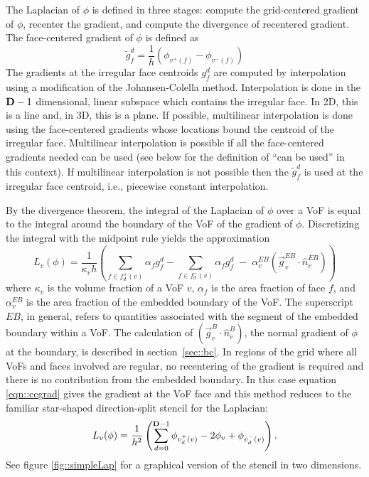 The Laplacian of $\phi$ is defined in three stages: compute the grid-centered
gradient of $\phi$, recenter the gradient, and compute the divergence of
recentered gradient.
The face-centered gradient of $\phi$ is defined as
\begin{equation}
\widetilde{g}^d_f = \frac{1}{h} \left( \phi_{v^+(f)} - \phi_{v^-(f)} \right)
\label{eqn::ccgrad}
\end{equation}
The gradients at the irregular face centroids $g_f^d$ are computed by
interpolation 
using a modification of the Johansen-Colella method.  Interpolation is done
in the ${\mathbf{D}} - 1$ dimensional, linear subspace which contains the irregular
face.  In 2D, this is a line and, in 3D, this is a plane.  If possible,
multilinear interpolation is done using the face-centered gradients whose
locations bound the centroid of the irregular face.  Multilinear interpolation
is possible if all the face-centered gradients needed can be used (see below
for the definition of ``can be used'' in this context).  If multilinear
interpolation is not possible then the $\widetilde{g}^d_f$ is used at the
irregular face centroid, i.e., piecewise constant interpolation.

By the divergence theorem, the integral of the Laplacian of $\phi$
over a VoF is equal to the integral around the boundary of the VoF of
the gradient of $\phi$. Discretizing the integral with the midpoint
rule yields the approximation 
\begin{equation}
L_v(\phi) = \frac{1}{\kappa_v h}
            \left( 
              \sum_{f\in f^+_d(v)} \alpha_f g^d_f   -
              \sum_{f\in f^-_d(v)} \alpha_f g^d_f \;-\;
              \alpha^{EB}_v \left( \vec{g}^{EB}_v \!\cdot\! \widehat{n}^{EB}_v
            \right)
\right)
\end{equation}
where $\kappa_v$ is the volume fraction of a VoF $v$, $\alpha_f$ is the area
fraction of face $f$, and $\alpha^{EB}_v$ is the area fraction of the embedded
boundary of the VoF.  The superscript $EB$, in general, refers to
quantities associated with the segment of the embedded boundary within a VoF.
The calculation
of $(\vec{g}^B_v \!\cdot\! \widehat{n}^B_v)$, the normal gradient of $\phi$ at
the boundary, is described in section~\ref{sec::bc}.
In regions of the grid where all VoFs and faces involved are regular,
no recentering of the gradient is required and there is no
contribution from the embedded boundary.
In this case 
equation \ref{eqn::ccgrad} gives the gradient at the VoF face
and this method reduces to the familiar star-shaped direction-split
stencil for the Laplacian:
\begin{equation}
L_v(\phi)  = \frac{1}{h^2}
             \left( \sum_{d = 0}^{{\mathbf{D}}-1}
               \phi_{v_d^+(v)} - 2\phi_v + \phi_{v_d^-(v)}
             \right).
\end{equation}
See figure \ref{fig::simpleLap} for a graphical version of the stencil
in two dimensions.

